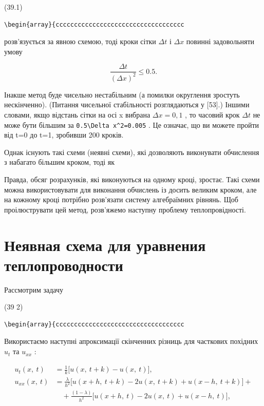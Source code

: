 \documentclass[
  ukrainian,
]{article}
\begin{document}
(39.1)

\begin{verbatim}
\begin{array}{ccccccccccccccccccccccccccccccccccc
\end{verbatim}

розв'язується за явною схемою, тоді кроки сітки \(\Delta t\) і
\(\Delta x\) повинні задовольняти умову

\[
\frac{\Delta t}{(\Delta x)^2} \leqslant 0.5.
\]

Інакше метод буде чисельно нестабільним (а помилки округлення зростуть
нескінченно). (Питання чисельної стабільності розглядаються у {[}53{]}.)
Іншими словами, якщо відстань сітки на осі x вибрана \(\Delta x=0,1\) ,
то часовий крок \(\Delta t\) не може бути більшим за
\texttt{0.5\textbackslash{}Delta\ x\^{}2=0.005} . Це означає, що ви
можете пройти від t=0 до t=1, зробивши 200 кроків.

Однак існують такі схеми (неявні схеми), які дозволяють виконувати
обчислення з набагато більшим кроком, тоді як

Правда, обсяг розрахунків, які виконуються на одному кроці, зростає.
Такі схеми можна використовувати для виконання обчислень із досить
великим кроком, але на кожному кроці потрібно розв'язати систему
алгебраїмних рівнянь. Щоб проілюструвати цей метод, розв'яжемо наступну
проблему теплопровідності.

\section{Неявная схема для уравнения
теплопроводности}\label{ux43dux435ux44fux432ux43dux430ux44f-ux441ux445ux435ux43cux430-ux434ux43bux44f-ux443ux440ux430ux432ux43dux435ux43dux438ux44f-ux442ux435ux43fux43bux43eux43fux440ux43eux432ux43eux434ux43dux43eux441ux442ux438}

Рассмотрим задачу

(39 2)

\begin{verbatim}
\begin{array}{ccccccccccccccccccccccccccccccccccc
\end{verbatim}

Використаємо наступні апроксимації скінченних різниць для часткових
похідних \(u_t\) та \(u_{xx}\) :

\[
\begin{split} u_t(x,\ t) &= \frac{1}{k} \big[ u(x,\ t+k) - u(x,\ t) \big], \\ u_{xx}(x,\ t) &= \frac{\lambda}{h^2} \big[ u(x+h,\ t+k) - 2u(x,\ t+k) + u(x-h,\ t+k) \big] + \\ &\quad + \frac{(1-\lambda)}{h^2} \big[ u(x+h,\ t) - 2u(x,\ t) + u(x-h,\ t) \big], \end{split}
\]
\end{document}
